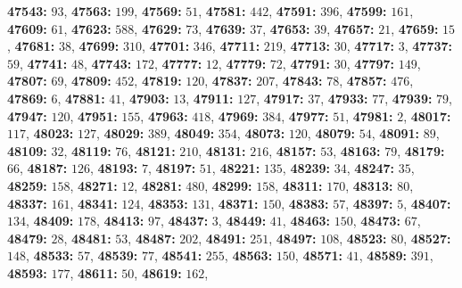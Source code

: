 \textsf{\bfseries 47543:} $93$, \textsf{\bfseries 47563:} $199$, \textsf{\bfseries 47569:} $51$, \textsf{\bfseries 47581:} $442$, \textsf{\bfseries 47591:} $396$, \textsf{\bfseries 47599:} $161$, \textsf{\bfseries 47609:} $61$, \textsf{\bfseries 47623:} $588$, \textsf{\bfseries 47629:} $73$, \textsf{\bfseries 47639:} $37$, \textsf{\bfseries 47653:} $39$, \textsf{\bfseries 47657:} $21$, \textsf{\bfseries 47659:} $15$, \textsf{\bfseries 47681:} $38$, \textsf{\bfseries 47699:} $310$, \textsf{\bfseries 47701:} $346$, \textsf{\bfseries 47711:} $219$, \textsf{\bfseries 47713:} $30$, \textsf{\bfseries 47717:} $3$, \textsf{\bfseries 47737:} $59$, \textsf{\bfseries 47741:} $48$, \textsf{\bfseries 47743:} $172$, \textsf{\bfseries 47777:} $12$, \textsf{\bfseries 47779:} $72$, \textsf{\bfseries 47791:} $30$, \textsf{\bfseries 47797:} $149$, \textsf{\bfseries 47807:} $69$, \textsf{\bfseries 47809:} $452$, \textsf{\bfseries 47819:} $120$, \textsf{\bfseries 47837:} $207$, \textsf{\bfseries 47843:} $78$, \textsf{\bfseries 47857:} $476$, \textsf{\bfseries 47869:} $6$, \textsf{\bfseries 47881:} $41$, \textsf{\bfseries 47903:} $13$, \textsf{\bfseries 47911:} $127$, \textsf{\bfseries 47917:} $37$, \textsf{\bfseries 47933:} $77$, \textsf{\bfseries 47939:} $79$, \textsf{\bfseries 47947:} $120$, \textsf{\bfseries 47951:} $155$, \textsf{\bfseries 47963:} $418$, \textsf{\bfseries 47969:} $384$, \textsf{\bfseries 47977:} $51$, \textsf{\bfseries 47981:} $2$, \textsf{\bfseries 48017:} $117$, \textsf{\bfseries 48023:} $127$, \textsf{\bfseries 48029:} $389$, \textsf{\bfseries 48049:} $354$, \textsf{\bfseries 48073:} $120$, \textsf{\bfseries 48079:} $54$, \textsf{\bfseries 48091:} $89$, \textsf{\bfseries 48109:} $32$, \textsf{\bfseries 48119:} $76$, \textsf{\bfseries 48121:} $210$, \textsf{\bfseries 48131:} $216$, \textsf{\bfseries 48157:} $53$, \textsf{\bfseries 48163:} $79$, \textsf{\bfseries 48179:} $66$, \textsf{\bfseries 48187:} $126$, \textsf{\bfseries 48193:} $7$, \textsf{\bfseries 48197:} $51$, \textsf{\bfseries 48221:} $135$, \textsf{\bfseries 48239:} $34$, \textsf{\bfseries 48247:} $35$, \textsf{\bfseries 48259:} $158$, \textsf{\bfseries 48271:} $12$, \textsf{\bfseries 48281:} $480$, \textsf{\bfseries 48299:} $158$, \textsf{\bfseries 48311:} $170$, \textsf{\bfseries 48313:} $80$, \textsf{\bfseries 48337:} $161$, \textsf{\bfseries 48341:} $124$, \textsf{\bfseries 48353:} $131$, \textsf{\bfseries 48371:} $150$, \textsf{\bfseries 48383:} $57$, \textsf{\bfseries 48397:} $5$, \textsf{\bfseries 48407:} $134$, \textsf{\bfseries 48409:} $178$, \textsf{\bfseries 48413:} $97$, \textsf{\bfseries 48437:} $3$, \textsf{\bfseries 48449:} $41$, \textsf{\bfseries 48463:} $150$, \textsf{\bfseries 48473:} $67$, \textsf{\bfseries 48479:} $28$, \textsf{\bfseries 48481:} $53$, \textsf{\bfseries 48487:} $202$, \textsf{\bfseries 48491:} $251$, \textsf{\bfseries 48497:} $108$, \textsf{\bfseries 48523:} $80$, \textsf{\bfseries 48527:} $148$, \textsf{\bfseries 48533:} $57$, \textsf{\bfseries 48539:} $77$, \textsf{\bfseries 48541:} $255$, \textsf{\bfseries 48563:} $150$, \textsf{\bfseries 48571:} $41$, \textsf{\bfseries 48589:} $391$, \textsf{\bfseries 48593:} $177$, \textsf{\bfseries 48611:} $50$, \textsf{\bfseries 48619:} $162$, 
